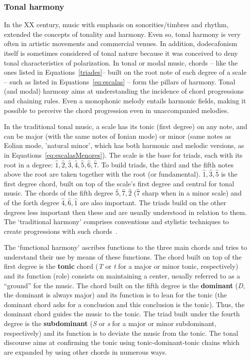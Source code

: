 \subsubsection{Tonal harmony}
In the XX century, music with emphasis on sonorities/timbres and rhythm, extended the concepts of tonality and harmony. Even so, tonal harmony is very often in artistic movements and commercial venues. In addition, dodecafonism itself is sometimes considered of tonal nature because it was conceived to deny tonal characteristics of polarization.
In tonal or modal music, chords -- like the ones listed in
Equations~\ref{triades}-- built on the root note of each degree of a scale  -- such as listed in Equations~\ref{eq:escalas} --  form the pillars of harmony. Tonal (and modal) harmony aims at understanding the incidence of chord progressions and chaining rules.
Even a monophonic melody entails harmonic fields, making it possible to perceive the chord progression even in unaccompanied melodies.

In the traditional tonal music, a scale has its tonic (first
degree) on any note, and can be major (with the same notes of Ionian mode) or minor (same notes as Eolian mode, 'natural minor', which has both harmonic and melodic versions, as in Equations~\ref{eq:escalasMenores}). The
scale is the base for triads, each with its root in a degree: $\hat{1},\hat{2},\hat{3},\hat{4},\hat{5},\hat{6},\hat{7}$.
To build triads, the third and the fifth notes above the root are taken together with the root (or fundamental).
$\hat{1},\hat{3},\hat{5}$ is the first degree chord,
 built on top of the scale's first degree and central for tonal music. The chords of the fifth degree $\hat{5},\hat{7},\hat{2}$ ($\hat{7}$ sharp when in a minor scale) and of the forth degree $\hat{4},\hat{6},\hat{1}$ are also important. The triads build on the other degrees less important then these and are usually understood in relation to them. The `traditional harmony' comprises conventions and stylistic techniques to create progressions with such chords~\cite{Harmonia}. 

The `functional harmony' ascribes functions to the three main chords and tries to understand their use by means of these functions. The chord built on top of the first degree is the \textbf{tonic} chord (\textit{T} or \textit{t} for a major or minor tonic, respectively) and its function (role) consists on maintaining a center, usually referred to as a ``ground'' for the music. The chord built on the fifth degree is the \textbf{dominant} (\textit{D}, the dominant is always major) and its function is to lean for the tonic
(the dominant chord asks for a conclusion and this conclusion is the tonic). Thus, the dominant chord guides the music to the tonic. The triad built under the fourth degree is the \textbf{subdominant} (\textit{S} or \textit{s} for a major or minor
subdominant, respectively) and its function is to deviate the music from the tonic. The tonal discourse aims at confirming the tonic using tonic-dominant-tonic chains which are expanded by using other chords in numerous ways.

